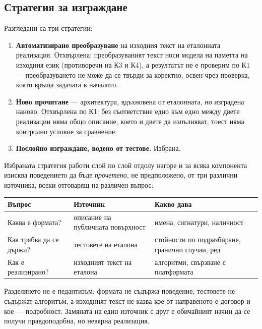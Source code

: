 \subsection{Стратегия за изграждане}
\label{subsec:port_strategy}

Разгледани са три стратегии:

\begin{enumerate}[topsep=2pt,itemsep=1pt,leftmargin=*]
\item \textbf{Автоматизирано преобразуване} на изходния текст на еталонната реализация.
      Отхвърлена: преобразуваният текст носи модела на паметта на изходния език (противоречи
      на К3 и К4), а резултатът не е проверим по К1 --- преобразуването не може да се твърди
      за коректно, освен чрез проверка, която връща задачата в началото.
\item \textbf{Ново прочитане} --- архитектура, вдъхновена от еталонната, но изградена
      наново. Отхвърлена по К1: без съответствие едно към едно между двете реализации няма
      общо описание, което и двете да изпълняват, тоест няма контролно условие за сравнение.
\item \textbf{Послойно изграждане, водено от тестове.} Избрана.
\end{enumerate}

Избраната стратегия работи слой по слой отдолу нагоре и за всяка компонента изисква
поведението да бъде \emph{прочетено}, не предположено, от три различни източника, всеки
отговарящ на различен въпрос:

\begin{center}
\begin{tabular}{@{}L{3.9cm}L{4.0cm}L{6.3cm}@{}}
\textbf{Въпрос} & \textbf{Източник} & \textbf{Какво дава} \\
\hline
Каква е формата? & описание на публичната повърхност & имена, сигнатури, наличност \\
Как трябва да се държи? & тестовете на еталона & стойности по подразбиране, гранични случаи, ред \\
Как е реализирано? & изходният текст на еталона & алгоритми, свързване с платформата \\
\end{tabular}
\end{center}

Разделянето не е педантизъм: формата не съдържа поведение, тестовете не съдържат алгоритъм,
а изходният текст не казва кое от направеното е договор и кое --- подробност. Замяната на
един източник с друг е обичайният начин да се получи правдоподобна, но невярна реализация.

